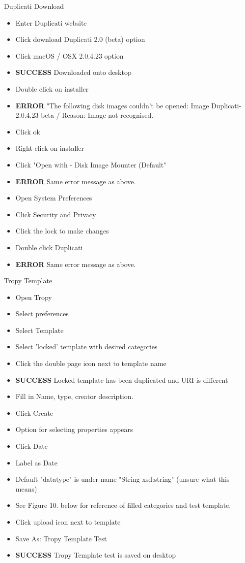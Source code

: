 \documentclass{article}
\begin{document}
Duplicati Download
\begin{itemize}
\item Enter Duplicati website
\item Click download Duplicati 2.0 (beta) option
\item Click macOS / OSX 2.0.4.23 option
\item \textbf{SUCCESS} Downloaded onto desktop
\item Double click on installer
\item \textbf{ERROR} "The following disk images couldn't be opened: Image Duplicati-2.0.4.23 beta / Reason: Image not recognised.
\item Click ok
\item Right click on installer
\item Click "Open with - Disk Image Mounter (Default"
\item \textbf{ERROR} Same error message as above.
\item Open System Preferences
\item Click Security and Privacy
\item Click the lock to make changes
\item Double click Duplicati
\item \textbf{ERROR} Same error message as above.
\end{itemize}

Tropy Template
\begin{itemize}
\item Open Tropy
\item Select preferences
\item Select Template
\item Select 'locked' template with desired categories
\item Click the double page icon next to template name
\item \textbf{SUCCESS} Locked template has been duplicated and URI is different
\item Fill in Name, type, creator description.
\item Click Create
\item Option for selecting properties appears
\item Click Date
\item Label as Date
\item Default "datatype" is under name "String xsd:string" (unsure what this means)
\item See Figure 10. below for reference of filled categories and test template.
\item Click upload icon next to template
\item Save As: Tropy Template Test
\item \textbf{SUCCESS} Tropy Template test is saved on desktop
\end{itemize}
\end{document}
